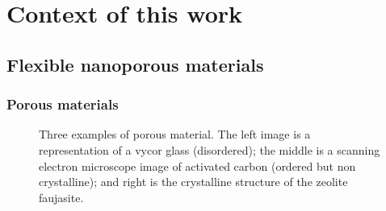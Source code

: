 \documentclass[thesis]{subfiles}
\begin{document}
\chapter{Context of this work}

\newpage
\section{Flexible nanoporous materials}

\subsection{Porous materials}

\begin{figure}[ht]
    \centering
    \hfill
    \hfill
    \caption{Three examples of porous material. The left image is a
    representation of a vycor glass (disordered)\cite{TODO}; the middle is a
    scanning electron microscope image of activated carbon (ordered but non
    crystalline)\cite{TODO}; and right is the crystalline structure of the
    zeolite faujasite.}
    \label{fig:porous-examples}
\end{figure}
\end{document}
